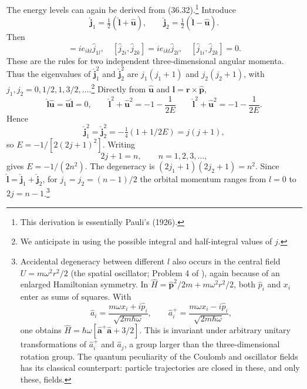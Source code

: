 The energy levels can again be derived from (36.32).\footnote{This derivation
is essentially Pauli's (1926).} Introduce
\begin{equation}
 \hat{\mathbf j}_1=\tfrac12(\hat{\mathbf l}+\hat{\mathbf u}),\qquad
 \hat{\mathbf j}_2=\tfrac12(\hat{\mathbf l}-\hat{\mathbf u}).\tag{36.33}
\end{equation}
Then
\begin{equation}
 [\hat j_{1i},\hat j_{1k}]=ie_{ikl}\hat j_{1l},\quad
 [\hat j_{2i},\hat j_{2k}]=ie_{ikl}\hat j_{2l},\quad
 [\hat j_{1i},\hat j_{2k}]=0.\tag{36.34}
\end{equation}
These are the rules for two independent three-dimensional angular momenta.
Thus the eigenvalues of $\hat{\mathbf j}_1^{2}$ and
$\hat{\mathbf j}_2^{2}$ are $j_1(j_1+1)$ and $j_2(j_2+1)$, with
$j_1,j_2=0,1/2,1,3/2,\ldots$.\footnote{We anticipate  in using the
possible integral and half-integral values of $j$.} Directly from
$\hat{\mathbf u}$ and $\hat{\mathbf l}=\mathbf r\times\hat{\mathbf p}$,
\[
 \hat{\mathbf l}\hat{\mathbf u}=\hat{\mathbf u}\hat{\mathbf l}=0,
 \qquad \hat{\mathbf l}^{2}+\hat{\mathbf u}^{2}=-1-\frac1{2E}
 \qquad \hat{\mathbf l}^{2}+\hat{\mathbf u}^{2}=-1-\frac1{2E}.
\]
Hence
\[
 \hat{\mathbf j}_1^{2}=\hat{\mathbf j}_2^{2}
 =-\tfrac14(1+1/2E)=j(j+1),
\]
so $E=-1/[2(2j+1)^2]$. Writing
\begin{equation}2j+1=n,\qquad n=1,2,3,\ldots,\tag{36.35}\end{equation}
gives $E=-1/(2n^2)$. The degeneracy is
$(2j_1+1)(2j_2+1)=n^2$. Since
$\hat{\mathbf l}=\hat{\mathbf j}_1+\hat{\mathbf j}_2$, for
$j_1=j_2=(n-1)/2$ the orbital momentum ranges from $l=0$ to $2j=n-1$.\footnote{Accidental degeneracy between different $l$ also occurs in the
central field $U=m\omega^2r^2/2$ (the spatial oscillator; Problem 4 of
), again because of an enlarged Hamiltonian symmetry. In
$\hat H=\hat{\mathbf p}^{2}/2m+m\omega^2r^2/2$, both $\hat p_i$ and $x_i$
enter as sums of squares. With
\[
 \hat a_i=\frac{m\omega x_i+i\hat p_i}{\sqrt{2m\hbar\omega}},\qquad
 \hat a_i^+=\frac{m\omega x_i-i\hat p_i}{\sqrt{2m\hbar\omega}},
\]
one obtains
$\hat H=\hbar\omega[\hat{\mathbf a}^{+}\hat{\mathbf a}+3/2]$.
This is invariant under arbitrary unitary transformations of $\hat a_i^+$
and $\hat a_j$, a group larger than the three-dimensional rotation group.
The quantum peculiarity of the Coulomb and oscillator fields has its classical
counterpart: particle trajectories are closed in these, and only these,
fields.}

